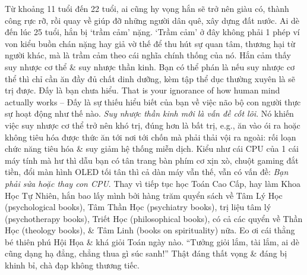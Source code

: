 \documentclass[12pt,twoside]{book}
\begin{document}
Từ khoảng 11 tuổi đến 22 tuổi, ai cũng hy vọng hắn sẽ trở nên giàu có, thành công rực rỡ, rồi quay về giúp đỡ những người dân quê, xây dựng đất nước. Ai dè đến lúc 25 tuổi, hắn bị `trầm cảm' nặng. `Trầm cảm' ở đây không phải 1 phép ví von kiểu buồn chán nặng hay giả vờ thế để thu hút sự quan tâm, thương hại từ người khác, mà là trầm cảm theo cái nghĩa chính thống của nó. Hắn cảm thấy suy nhược cơ thể \& suy nhược thần kinh. Bạn có thể phán là nếu suy nhược cơ thể thì chỉ cần ăn đầy đủ chất dinh dưỡng, kèm tập thể dục thường xuyên là sẽ trị được. Đấy là bạn chưa hiểu. That is your ignorance of how human mind actually works -- Đấy là sự thiếu hiểu biết của bạn về việc não bộ con người thực sự hoạt động như thế nào. {\it Suy nhược thần kinh mới là vấn đề cốt lõi}. Nó khiến việc suy nhược cơ thể trở nên khó trị, đúng hơn là bất trị, e.g., ăn vào ói ra hoặc không tiêu hóa được thức ăn tới nơi tới chốn mà phải thải vội ra ngoài: rối loạn chức năng tiêu hóa \& suy giảm hệ thống miễn dịch. Kiểu như cái CPU của 1 cái máy tính mà hư thì dẫu bạn có tân trang bàn phím cơ xịn xò, chuột gaming đắt tiền, đổi màn hình OLED tối tân thì cả dàn máy vẫn thế, vẫn có vấn đề: {\it Bạn phải sửa hoặc thay con CPU}. Thay vì tiếp tục học Toán Cao Cấp, hay làm Khoa Học Tự Nhiên, hắn bao lấy mình bởi hàng trăm quyển sách về Tâm Lý Học (psychological books), Tâm Thần Học (psychiatry books), trị liệu tâm lý (psychotherapy books), Triết Học (philosophical books), có cả các quyển về Thần Học (theology books), \& Tâm Linh (books on spirituality) nữa. Eo ơi cái thằng bé thiên phú Hội Họa \& khá giỏi Toán ngày nào. ``Tưởng giỏi lắm, tài lắm, ai dè cũng dạng hạ đẳng, chẳng thua gì súc sanh!'' Thật đáng thất vọng \& đáng bị khinh bỉ, chà đạp không thương tiếc.
\end{document}

